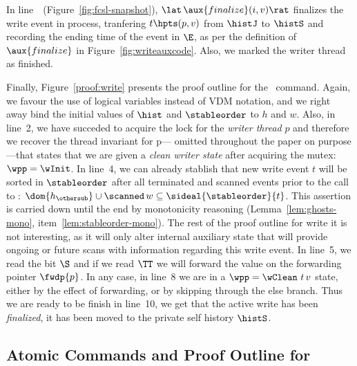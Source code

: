 In line~\lineWrtFnz~(Figure~\ref{fig:fcsl-snapshot}), $
\lat\,\aux{finalize}(i,v)\rat $ finalizes the write event in process,
tranfering $t \hpts (p,v)$ from $\histJ$ to $\histS$ and recording the
ending time of the event in $\E$, as per the definition of
$\aux{finalize}$ in Figure~\ref{fig:writeauxcode}. Also, we marked the
writer thread as finished.


Finally, Figure~\ref{proof:write} presents the proof outline for the
\jywrite\ command. Again, we favour the use of logical variables
instead of VDM notation, and we right away bind the initial values of
$\hist$ and $\stableorder$ to $h$ and $w$. Also, in line~2, we have
succeded to acquire the lock for the {\it writer thread} $p$ and
therefore we recover the thread invariant for p--- omitted throughout
the paper on purpose---that states that we are given a {\it clean
  writer state } after acquiring the mutex: $\wpp =\wInit$. In line~4,
we can already stablish that new write event $t$ will be sorted in
$\stableorder$ after all terminated and scanned events prior to the
call to \jywrite: $\dom{h_{\othersub}} \cup \scanned\, w \subseteq
\sideal{\stableorder}{t}$. This assertion is carried down until the
end by monotonicity reasoning (Lemma~\ref{lem:ghosts-mono},
item~\ref{lem:stableorder-mono}). The rest of the proof outline for
write it is not interesting, as it will only alter internal auxiliary
state that will provide ongoing or future scans with information
regarding this write event. In line~5, we read the bit $\S$ and if we
read $\TT$ we will forward the value on the forwarding pointer
$\fwdp{p}$. In any case, in line~8 we are in a $\wpp = \wClean\ t\, v$
state, either by the effect of forwarding, or by skipping through the
else branch. Thus we are ready to be finish in line~10, we get that
the active write has been {\it finalized}, \ie it has been moved to
the private self history $\histS$.

\subsection{Atomic Commands and Proof Outline for \jywrite}
\label{sc:atoms-write}

\def\botLGY{{\ensuremath{\mathsf{fwdLastGY}}}}
\def\histLGY{{\ensuremath{\mathsf{lastGYHist}}}}
\def\greenH{{\ensuremath{\mathsf{green\_prefix}}}}
\newcommand{\spz}{S_z}

